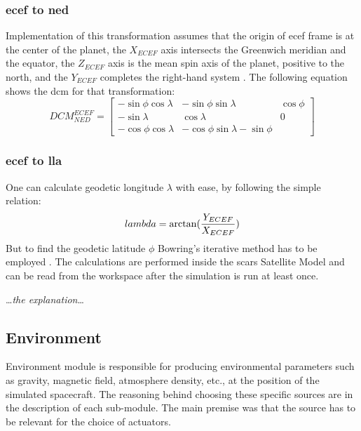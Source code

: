     \subsubsection{\ac{ecef} to \ac{ned}}
       Implementation of this transformation assumes that the origin of \ac{ecef} frame is at the center of the planet, the $X_{ECEF}$ axis intersects the Greenwich meridian and the equator, the $Z_{ECEF}$ axis is the mean spin axis of the planet, positive to the north, and the $Y_{ECEF}$ completes the right-hand system \cite{aboutareospace}. The following equation shows the \ac{dcm} for that transformation:
       \begin{equation}
           DCM^{ECEF}_{NED} = \begin{bmatrix} -\sin\phi\cos\lambda & -\sin\phi\sin\lambda & \cos\phi\\
               -\sin\lambda & \cos\lambda & 0 \\
               -\cos\phi\cos\lambda & -\cos\phi\sin\lambda -\sin\phi \end{bmatrix}
       \end{equation}

    \subsubsection{\ac{ecef} to \ac{lla}}
        One can calculate geodetic longitude $\lambda$ with ease, by following the simple relation:
        \begin{equation}
            \\lambda = \arctan(\frac{Y_{ECEF}}{X_{ECEF}})
        \end{equation}
        But to find the geodetic latitude $\phi$ Bowring's iterative method has to be employed \cite{gerdan1999transforming}. The calculations are performed inside the \ac{scars} Satellite Model and can be read from the workspace after the simulation is run at least once.

        \dots\textit{the explanation}\dots



\subsection{Environment}
    Environment module is responsible for producing environmental parameters such as gravity, magnetic field, atmosphere density, etc., at the position of the simulated spacecraft. The reasoning behind choosing these specific sources are in the description of each sub-module. The main premise was that the source has to be relevant for the choice of actuators.
    
